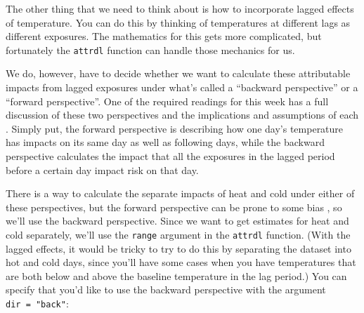 \documentclass[
]{book}
\newenvironment{Shaded}{\begin{snugshade}}{\end{snugshade}}
\newcommand{\AttributeTok}[1]{\textcolor[rgb]{0.13,0.29,0.53}{#1}}
\newcommand{\CommentTok}[1]{\textcolor[rgb]{0.56,0.35,0.01}{\textit{#1}}}
\newcommand{\DecValTok}[1]{\textcolor[rgb]{0.00,0.00,0.81}{#1}}
\newcommand{\FunctionTok}[1]{\textcolor[rgb]{0.13,0.29,0.53}{\textbf{#1}}}
\newcommand{\NormalTok}[1]{#1}
\newcommand{\SpecialCharTok}[1]{\textcolor[rgb]{0.81,0.36,0.00}{\textbf{#1}}}
\newcommand{\StringTok}[1]{\textcolor[rgb]{0.31,0.60,0.02}{#1}}
\begin{document}
The other thing that we need to think about is how to incorporate lagged effects of temperature. You can do this by thinking of temperatures at different lags as different exposures. The mathematics for this gets more complicated, but fortunately the \texttt{attrdl} function can handle those mechanics for us.

We do, however, have to decide whether we want to calculate these attributable impacts from lagged exposures under what's called a ``backward perspective'' or a ``forward perspective''. One of the required readings for this week has a full discussion of these two perspectives and the implications and assumptions of each \citep{gasparrini2014attributable}. Simply put, the forward perspective is describing how one day's temperature has impacts on its same day as well as following days, while the backward perspective calculates the impact that all the exposures in the lagged period before a certain day impact risk on that day.

There is a way to calculate the separate impacts of heat and cold under either of these perspectives, but the forward perspective can be prone to some bias \citep{gasparrini2014attributable}, so we'll use the backward perspective. Since we want to get estimates for heat and cold separately, we'll use the \texttt{range} argument in the \texttt{attrdl} function. (With the lagged effects, it would be tricky to try to do this by separating the dataset into hot and cold days, since you'll have some cases when you have temperatures that are both below and above the baseline temperature in the lag period.) You can specify that you'd like to use the backward perspective with the argument \texttt{dir\ =\ "back"}:

\begin{Shaded}
\end{Shaded}
\end{document}
